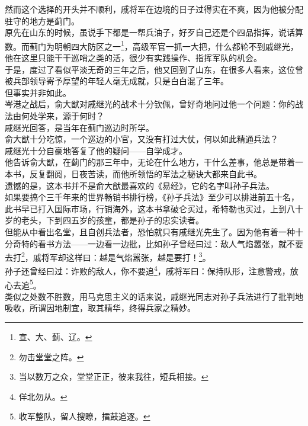 \begin{multicols}{\theparacolNo}
然而这个选择的开头并不顺利，戚将军在边境的日子过得实在不爽，因为他被分配驻守的地方是蓟门。\\

原先在山东的时候，虽说手下都是一帮兵油子，好歹自己还是个四品指挥，说话算数。而蓟门为明朝四大防区之一\footnote{宣、大、蓟、辽。}，高级军官一抓一大把，什么都轮不到戚继光，他在这里只能干干巡哨之类的活，很少有实践操作、指挥军队的机会。\\

于是，度过了看似平淡无奇的三年之后，他又回到了山东，在很多人看来，这位曾被兵部领导寄予厚望的年轻人毫无成就，只是白白混了三年。\\

但事实并非如此。\\

岑港之战后，俞大猷对戚继光的战术十分钦佩，曾好奇地问过他一个问题：你的战法由何处学来，源于何时？\\

戚继光回答，是当年在蓟门巡边时所学。\\

俞大猷十分吃惊，一个巡边的小官，又没有打过大仗，何以如此精通兵法？\\

戚继光十分自豪地答复了他的疑问——自学成才。\\

他告诉俞大猷，在蓟门的那三年中，无论在什么地方，干什么差事，他总是带着一本书，反复翻阅，日夜苦读，而他所领悟的军法之秘诀大都来自此书。\\

遗憾的是，这本书并不是俞大猷最喜欢的《易经》，它的名字叫孙子兵法。\\

如果要搞个三千年来的世界畅销书排行榜，《孙子兵法》至少可以排进前五十名，此书早已打入国际市场，行销海外，这本书拿破仑买过，希特勒也买过，上到八十岁的老头，下到四五岁的孩童，都是孙子的忠实读者。\\

但能从中看出名堂，且自创兵法者，恐怕就只有戚继光先生了。因为他有着一种十分奇特的看书方法——一边看一边批，比如孙子曾经曰过：敌人气焰嚣张，就不要去打\footnote{勿击堂堂之阵。}，戚将军却这样曰：越是气焰嚣张，越是要打！\footnote{当以数万之众，堂堂正正，彼来我往，短兵相接。}。\\

孙子还曾经曰过：诈败的敌人，你不要追\footnote{佯北勿从。}，戚将军曰：保持队形，注意警戒，放心去追\footnote{收军整队，留人搜瞭，擂鼓追逐。}。\\

类似之处数不胜数，用马克思主义的话来说，戚继光同志对孙子兵法进行了批判地吸收，所谓因地制宜，取其精华，终得兵家之精妙。\\


\end{multicols}
